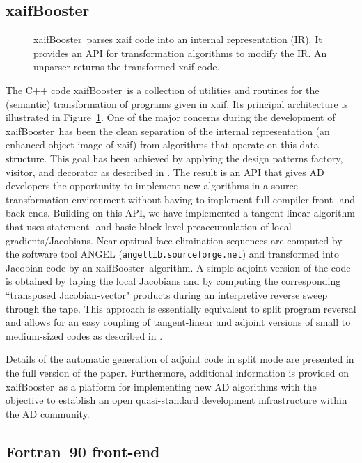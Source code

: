 \documentclass[acmtocl,acmnow]{acmtrans2m}
\newcommand{\xaifBooster}{xaifBooster}
\newcommand{\reffig}[1]{Figure~\ref{#1}}
\begin{document}
\subsection{\xaifBooster} 
\begin{figure}
\caption{\xaifBooster\ parses xaif code into an internal representation (IR).
It provides an API for transformation algorithms to modify the IR. An unparser
returns the transformed xaif code.} \label{fig:xaifBooster}
\end{figure}
The C++ code \xaifBooster\ is a collection of utilities and routines for the
(semantic) transformation of programs given in xaif. Its principal architecture 
is illustrated in \reffig{fig:xaifBooster}. One of the major concerns during
the development of \xaifBooster\ has been the clean separation of the internal
representation (an enhanced object image of xaif) from algorithms that operate 
on this data structure. This goal has been achieved by applying the design 
patterns \cite{DesignPatterns} factory, visitor, and decorator as described in \cite{UtNa03}.
The result is an API that gives AD developers the opportunity
to implement new algorithms in a source transformation environment without
having to implement full compiler front- and back-ends. Building on
this API, we have implemented a tangent-linear algorithm that uses statement-
\cite{SEUpreacc} and basic-block-level preaccumulation of local 
gradients/Jacobians. Near-optimal face elimination \cite{ElimTechMP} sequences 
are computed by the software tool 
ANGEL \cite{AGN03,SAGA} ({\tt angellib.sourceforge.net}) and transformed into 
Jacobian code by
an \xaifBooster\ algorithm. A simple adjoint version of the code is obtained
by taping the local Jacobians 
and by computing the corresponding ``transposed Jacobian-vector" products 
during an interpretive reverse sweep through the tape. This approach is
essentially equivalent to split program reversal \cite{Gri00} and allows
for an easy coupling of tangent-linear and adjoint versions of small to 
medium-sized codes as described in \cite{NaHe03}. 

Details of the automatic generation of adjoint code in split mode are presented
in the full version of the paper. Furthermore, additional information is 
provided on \xaifBooster\ as a platform for implementing new AD algorithms with 
the objective to establish an open quasi-standard development infrastructure
within the AD community.
\subsection{Fortran~90 front-end} 
\end{document}

